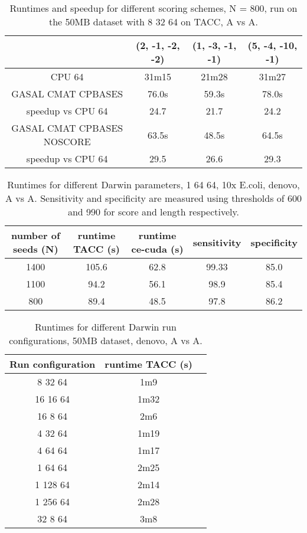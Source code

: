 \documentclass[../main/thesis.tex]{subfiles}
\begin{document}
\begin{table}
\centering
\caption{Runtimes and speedup for different scoring schemes, N = 800, run on the 50MB dataset with 8 32 64 on TACC, A vs A.}
\label{tbl:darwin8}
\begin{tabular}{c||c|c|c}
& (2, -1, -2, -2) & (1, -3, -1, -1) & (5, -4, -10, -1) \\ \hline
CPU 64 & 31m15 & 21m28 & 31m27 \\ \hline
GASAL CMAT CPBASES & 76.0s & 59.3s & 78.0s \\
speedup vs CPU 64 & 24.7 & 21.7 & 24.2 \\ \hline
GASAL CMAT CPBASES NOSCORE & 63.5s & 48.5s & 64.5s \\
speedup vs CPU 64 & 29.5 & 26.6 & 29.3 \\
\end{tabular}
\end{table}








\begin{table}
\centering
\caption{Runtimes for different Darwin parameters, 1 64 64, 10x E.coli, denovo, A vs A. Sensitivity and specificity are measured using thresholds of 600 and 990 for score and length respectively.}
\label{tbl:darwin4}
\begin{tabular}{c|cccc}
number of seeds (N) & runtime TACC (s) & runtime ce-cuda (s) & sensitivity & specificity \\ \hline
1400 & 105.6 & 62.8 & 99.33 & 85.0 \\
1100 & 94.2 & 56.1 & 98.9 & 85.4 \\
800 & 89.4 & 48.5 & 97.8 & 86.2 \\
\end{tabular}
\end{table}



\begin{table}
\centering
\caption{Runtimes for different Darwin run configurations, 50MB dataset, denovo, A vs A.}
\label{tbl:darwin6}
\begin{tabular}{c|cc}
Run configuration & runtime TACC (s) \\ \hline
 8 32 64 & 1m9 \\
16 16 64 & 1m32 \\
16  8 64 & 2m6 \\
 4 32 64 & 1m19 \\
 4 64 64 & 1m17 \\
 1 64 64 & 2m25 \\
1 128 64 & 2m14 \\
1 256 64 & 2m28 \\
 32 8 64 & 3m8 \\
\end{tabular}
\end{table}
\end{document}
